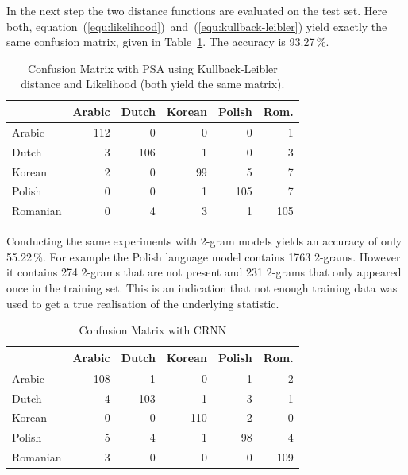 \documentclass{article}
\begin{document}
In the next step the two distance functions are evaluated on the test set. Here both, equation~(\ref{equ:likelihood})~and~(\ref{equ:kullback-leibler}) yield exactly the same confusion matrix, given in Table~\ref{tab:confusion_matrix_psa}. The accuracy is 93.27\,\%.

\begin{table}[h]
\begin{center}
\begin{tabular}{ l | r r r r r }
          & Arabic & Dutch & Korean & Polish & Rom.\\
\hline
 Arabic   & 112    & 0     & 0      & 0      & 1\\
 Dutch    & 3      & 106   & 1      & 0      & 3\\
 Korean   & 2      & 0     & 99     & 5      & 7\\
 Polish   & 0      & 0     & 1      & 105    & 7\\
 Romanian & 0      & 4     & 3      & 1     & 105\\
\end{tabular}
\end{center}
\caption{Confusion Matrix with PSA using Kullback-Leibler distance and Likelihood (both yield the same matrix). }
\label{tab:confusion_matrix_psa}
\end{table}

Conducting the same experiments with 2-gram models yields an accuracy of only 55.22\,\%. For example the Polish language model contains 1763 2-grams. However it contains 274 2-grams that are not present and 231 2-grams that only appeared once in the training set. This is an indication that not enough training data was used to get a true realisation of the underlying statistic.

\begin{table}[h]
\begin{center}
\begin{tabular}{ l | r r r r r }
          & Arabic & Dutch & Korean & Polish & Rom.\\
\hline
 Arabic   & 108    & 1     & 0      & 1      & 2\\
 Dutch    & 4      & 103   & 1      & 3      & 1\\
 Korean   & 0      & 0     & 110    & 2      & 0\\
 Polish   & 5      & 4     & 1      & 98    & 4\\
 Romanian & 3      & 0     & 0      & 0     & 109\\
\end{tabular}
\end{center}
\caption{Confusion Matrix with CRNN}
\label{tab:confusion_matrix_crnn}
\end{table}
\end{document}
